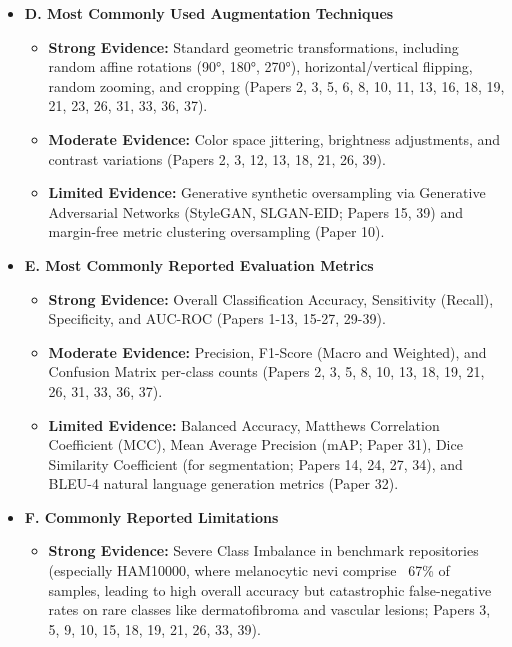 \documentclass[11pt,a4paper]{article}
\begin{document}
\begin{itemize}
\begin{itemize}
  \item \textbf{Moderate Evidence:} Morphological hair artifact removal algorithms, predominantly DullRazor or bottom-hat filtering (Papers 2, 14, 15, 23, 24, 27, 39).
  \item \textbf{Limited Evidence:} Deep learning-based hair segmentation and inpainting via U-Net (Paper 14), Nonnegative Matrix Factorization (NMF) color unmixing (Paper 34), and nonlinear power-law contrast transformations (Paper 1).
\end{itemize}
\item \textbf{D. Most Commonly Used Augmentation Techniques}
\begin{itemize}
  \item \textbf{Strong Evidence:} Standard geometric transformations, including random affine rotations (90°, 180°, 270°), horizontal/vertical flipping, random zooming, and cropping (Papers 2, 3, 5, 6, 8, 10, 11, 13, 16, 18, 19, 21, 23, 26, 31, 33, 36, 37).
  \item \textbf{Moderate Evidence:} Color space jittering, brightness adjustments, and contrast variations (Papers 2, 3, 12, 13, 18, 21, 26, 39).
  \item \textbf{Limited Evidence:} Generative synthetic oversampling via Generative Adversarial Networks (StyleGAN, SLGAN-EID; Papers 15, 39) and margin-free metric clustering oversampling (Paper 10).
\end{itemize}
\item \textbf{E. Most Commonly Reported Evaluation Metrics}
\begin{itemize}
  \item \textbf{Strong Evidence:} Overall Classification Accuracy, Sensitivity (Recall), Specificity, and AUC-ROC (Papers 1-13, 15-27, 29-39).
  \item \textbf{Moderate Evidence:} Precision, F1-Score (Macro and Weighted), and Confusion Matrix per-class counts (Papers 2, 3, 5, 8, 10, 13, 18, 19, 21, 26, 31, 33, 36, 37).
  \item \textbf{Limited Evidence:} Balanced Accuracy, Matthews Correlation Coefficient (MCC), Mean Average Precision (mAP; Paper 31), Dice Similarity Coefficient (for segmentation; Papers 14, 24, 27, 34), and BLEU-4 natural language generation metrics (Paper 32).
\end{itemize}
\item \textbf{F. Commonly Reported Limitations}
\begin{itemize}
  \item \textbf{Strong Evidence:} Severe Class Imbalance in benchmark repositories (especially HAM10000, where melanocytic nevi comprise ~67\% of samples, leading to high overall accuracy but catastrophic false-negative rates on rare classes like dermatofibroma and vascular lesions; Papers 3, 5, 9, 10, 15, 18, 19, 21, 26, 33, 39).

\end{itemize}
\end{itemize}
\end{document}
